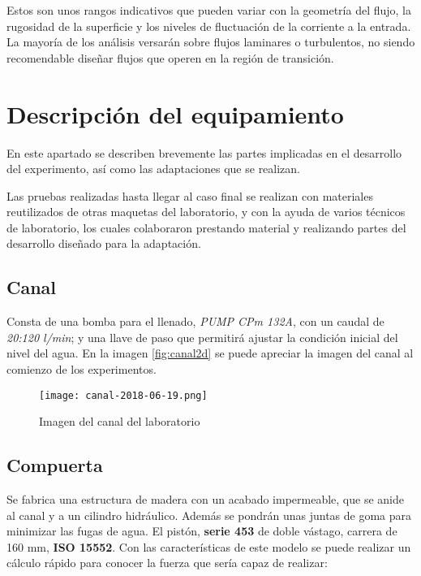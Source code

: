 Estos son unos rangos indicativos que pueden variar con la geometría del
flujo, la rugosidad de la superficie y los niveles de fluctuación de la
corriente a la entrada. La mayoría de los análisis versarán sobre flujos
laminares o turbulentos, no siendo recomendable diseñar flujos que
operen en la región de transición.

\section{Descripción del equipamiento}\label{header-n133}

En este apartado se describen brevemente las partes implicadas en el
desarrollo del experimento, así como las adaptaciones que se realizan.

Las pruebas realizadas hasta llegar al caso final se realizan con
materiales reutilizados de otras maquetas del laboratorio, y con la
ayuda de varios técnicos de laboratorio, los cuales colaboraron
prestando material y realizando partes del desarrollo diseñado para la adaptación.

\subsection{Canal}\label{header-n136}

Consta de una bomba para el llenado, \emph{PUMP CPm 132A}, con un caudal
de \emph{20:120 l/min}; y una llave de paso que permitirá ajustar la
condición inicial del nivel del agua. En la imagen \autoref{fig:canal2d} se puede apreciar la imagen del canal al comienzo de los experimentos.

\begin{figure}
\centering
\texttt{[image: canal-2018-06-19.png]}
\caption{Imagen del canal del laboratorio}
\label{fig:canal2d}
\end{figure}

\subsection{Compuerta}\label{header-n143}

Se fabrica una estructura de madera con un acabado impermeable, que se
anide al canal y a un cilindro hidráulico. Además se pondrán unas juntas
de goma para minimizar las fugas de agua. El pistón, \textbf{serie 453}
de doble vástago, carrera de 160 mm, \textbf{ISO 15552}. Con las
características de este modelo se puede realizar un cálculo rápido para
conocer la fuerza que sería capaz de realizar:


